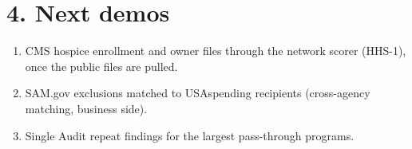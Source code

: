 \documentclass[letterpaper,11pt]{article}
\providecommand{\tightlist}{\setlength{\itemsep}{0pt}\setlength{\parskip}{0pt}}
\begin{document}
\hypertarget{next-demos}{%
\section*{4. Next demos}\label{next-demos}}

\begin{enumerate}
\def\labelenumi{\arabic{enumi}.}
\tightlist
\item
  CMS hospice enrollment and owner files through the network scorer
  (HHS-1), once the public files are pulled.
\item
  SAM.gov exclusions matched to USAspending recipients (cross-agency
  matching, business side).
\item
  Single Audit repeat findings for the largest pass-through programs.
\end{enumerate}
\end{document}
